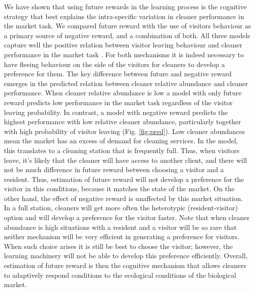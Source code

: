 \documentclass[]{rsos}%
\begin{document}
We have shown that using future rewards in the learning process is the
cognitive strategy that best explains the intra-specific variation in
cleaner performance in the market task. We compared future reward with
the use of visitors behaviour as a primary source of negative reward,
and a combination of both. All three models capture well the positive
relation between visitor leaving behaviour and cleaner performance in
the market task \citep{triki_Biological_2019}. For both mechanisms it is
indeed necessary to have fleeing behaviour on the side of the visitors
for cleaners to develop a preference for them. The key difference
between future and negative reward emerges in the predicted relation
between cleaner relative abundance and cleaner performance. When cleaner
relative abundance is low a model with only future reward predicts low
performance in the market task regardless of the visitor leaving
probability. In contrast, a model with negative reward predicts the
highest performance with low relative cleaner abundance, particularly
together with high probability of visitor leaving (Fig. \ref{fig:pred}).
Low cleaner abundances mean the market has an excess of demand for
cleaning services. In the model, this translates to a cleaning station
that is frequently full. Thus, when visitors leave, it's likely that the
cleaner will have access to another client, and there will not be much
difference in future reward between choosing a visitor and a resident.
Thus, estimation of future reward will not develop a preference for the
visitor in this conditions, because it matches the state of the market.
On the other hand, the effect of negative reward is unaffected by this
market situation. In a full station, cleaners will get more often the
heterotypic (resident-visitor) option and will develop a preference for
the visitor faster. Note that when cleaner abundance is high situations
with a resident and a visitor will be so rare that neither mechanism
will be very efficient in generating a preference for visitors. When
such choice arises it is still be best to choose the visitor; however,
the learning machinery will not be able to develop this preference
efficiently. Overall, estimation of future reward is then the cognitive
mechanism that allows cleaners to adaptively respond conditions to the
ecological conditions of the biological market.
\end{document}
